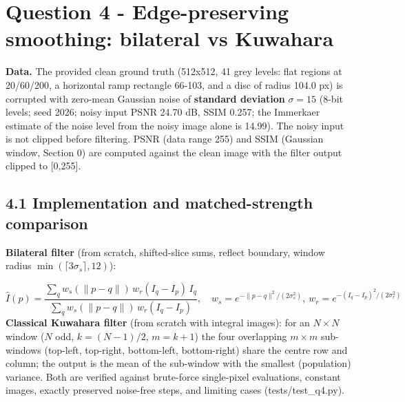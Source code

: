\documentclass[10pt,a4paper]{article}
\begin{document}
\section{Question 4 - Edge-preserving smoothing: bilateral vs Kuwahara}
\textbf{Data.} The provided clean ground truth (512x512, 41 grey levels: flat regions at 20/60/200, a horizontal ramp rectangle 66-103, and a disc of radius 104.0 px) is corrupted with zero-mean Gaussian noise of \textbf{standard deviation }$\sigma=15$ (8-bit levels; seed 2026; noisy input PSNR 24.70 dB, SSIM 0.257; the Immerkaer estimate of the noise level from the noisy image alone is 14.99). The noisy input is not clipped before filtering. PSNR (data range 255) and SSIM (Gaussian window, Section 0) are computed against the clean image with the filter output clipped to [0,255].

\subsection{4.1 Implementation and matched-strength comparison}
\textbf{Bilateral filter} (from scratch, shifted-slice sums, reflect boundary, window radius $\min(\lceil3\sigma_s\rceil,12)$): 

\begin{equation}\hat I(p)=\frac{\sum_{q}w_s(\|p-q\|)\,w_r(I_q-I_p)\,I_q}{\sum_{q}w_s(\|p-q\|)\,w_r(I_q-I_p)},\quad w_s=e^{-\|p-q\|^2/(2\sigma_s^2)},\ w_r=e^{-(I_q-I_p)^2/(2\sigma_r^2)}\end{equation}
\textbf{Classical Kuwahara filter} (from scratch with integral images): for an $N\times N$ window ($N$ odd, $k=(N-1)/2$, $m=k+1$) the four overlapping $m\times m$ sub-windows (top-left, top-right, bottom-left, bottom-right) share the centre row and column; the output is the mean of the sub-window with the smallest (population) variance. Both are verified against brute-force single-pixel evaluations, constant images, exactly preserved noise-free steps, and limiting cases (tests/test\_q4.py).
\end{document}
